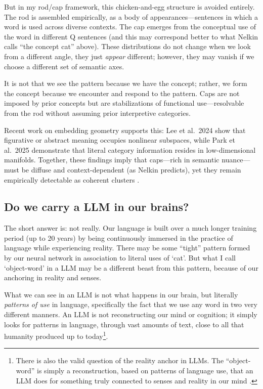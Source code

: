 \documentclass[12pt]{article}
\begin{document}
But in my rod/cap framework, this chicken-and-egg structure is avoided entirely. The rod is assembled empirically, as a body of appearances---sentences in which a word is used across diverse contexts. The cap emerges from the conceptual use of the word in different Q sentences (and this may correspond better to what Nelkin calls ``the concept cat'' above). These distributions do not change when we look from a different angle, they just \emph{appear} different; however, they may vanish if we choose a different set of semantic axes.

It is not that we see the pattern because we have the concept; rather, we form the concept because we encounter and respond to the pattern. Caps are not imposed by prior concepts but are stabilizations of functional use---resolvable from the rod without assuming prior interpretive categories.

Recent work on embedding geometry supports this: Lee et al.~2024 show that figurative or abstract meaning occupies nonlinear subspaces, while Park et al.~2025 demonstrate that literal category information resides in low-dimensional manifolds. Together, these findings imply that caps---rich in semantic nuance---must be diffuse and context-dependent (as Nelkin predicts), yet they remain empirically detectable as coherent clusters \cite{ref-leeGeometric2024,ref-parkGeometry2025}.

\subsection{Do we carry a LLM in our brains?}\label{do-we-carry-a-llm-in-our-brains}

The short answer is: not really. Our language is built over a much longer training period (up to 20 years) by being continuously immersed in the practice of language while experiencing reality. There may be some ``tight'' pattern formed by our neural network in association to literal uses of `cat'. But what I call `object-word' in a LLM may be a different beast from this pattern, because of our anchoring in reality and senses.

What we can see in an LLM is not what happens in our brain, but literally \emph{patterns of use} in language, specifically the fact that we use any word in two very different manners. An LLM is not reconstructing our mind or cognition; it simply looks for patterns in language, through vast amounts of text, close to all that humanity produced up to today\footnote{There is also the valid question of the reality anchor in LLMs. The ``object-word'' is simply a reconstruction, based on patterns of language use, that an LLM does for something truly connected to senses and reality in our mind \cite{ref-prudenBirth2006}.}.
\end{document}
